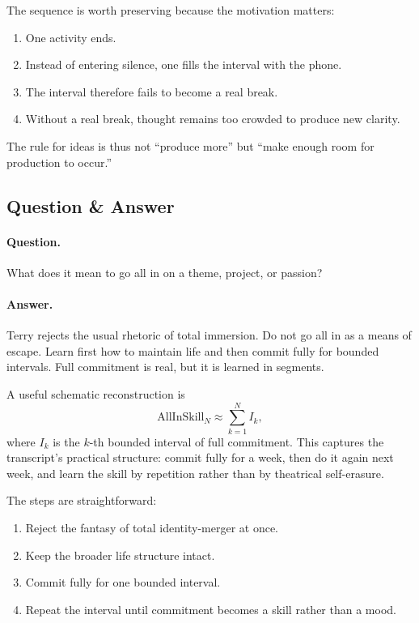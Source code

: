 The sequence is worth preserving because the motivation matters:
\begin{enumerate}
\item One activity ends.
\item Instead of entering silence, one fills the interval with the phone.
\item The interval therefore fails to become a real break.
\item Without a real break, thought remains too crowded to produce new clarity.
\end{enumerate}
The rule for ideas is thus not ``produce more'' but ``make enough room for production to occur.''

\subsection{Question \& Answer}

\paragraph{Question.} What does it mean to go all in on a theme, project, or passion?

\paragraph{Answer.} Terry rejects the usual rhetoric of total immersion. Do not go all in as a means of escape. Learn first how to maintain life and then commit fully for bounded intervals. Full commitment is real, but it is learned in segments.

A useful schematic reconstruction is
\begin{equation}
\text{AllInSkill}_N \approx \sum_{k=1}^{N} I_k,
\end{equation}
where \(I_k\) is the \(k\)-th bounded interval of full commitment. This captures the transcript's practical structure: commit fully for a week, then do it again next week, and learn the skill by repetition rather than by theatrical self-erasure.

The steps are straightforward:
\begin{enumerate}
\item Reject the fantasy of total identity-merger at once.
\item Keep the broader life structure intact.
\item Commit fully for one bounded interval.
\item Repeat the interval until commitment becomes a skill rather than a mood.
\end{enumerate}


